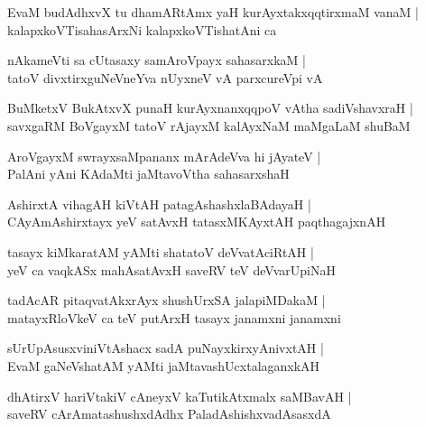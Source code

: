 \documentclass[twoside,12pt,openright]{book}
\newcounter{shloka}[chapter]
\begin{document}
\begin{shloka}%
EvaM budAdhxvX tu dhamARtAmx yaH kurAyxtakxqqtirxmaM vanaM |\\
kalapxkoVTisahasArxNi kalapxkoVTishatAni ca 
\end{shloka}

\begin{shloka}%
nAkameVti sa cUtasaxy samAroVpayx sahasarxkaM |\\
tatoV divxtirxguNeVneYva nUyxneV vA parxcureVpi vA
\end{shloka}

\begin{shloka}%
BuMketxV BukAtxvX punaH kurAyxnanxqqpoV vAtha sadiVshavxraH |\\
savxgaRM BoVgayxM tatoV rAjayxM kalAyxNaM maMgaLaM shuBaM 
\end{shloka}

\begin{shloka}%
AroVgayxM swrayxsaMpananx mArAdeVva hi jAyateV |\\
PalAni yAni KAdaMti jaMtavoVtha sahasarxshaH 
\end{shloka}

\begin{shloka}%
AshirxtA vihagAH kiVtAH patagAshashxlaBAdayaH |\\
CAyAmAshirxtayx yeV satAvxH tatasxMKAyxtAH paqthagajxnAH 
\end{shloka}

\begin{shloka}%
tasayx kiMkaratAM yAMti shatatoV deVvatAciRtAH |\\
yeV ca vaqkASx mahAsatAvxH saveRV teV deVvarUpiNaH 
\end{shloka}

\begin{shloka}%
tadAcAR pitaqvatAkxrAyx shushUrxSA jalapiMDakaM |\\
matayxRloVkeV ca teV putArxH tasayx janamxni janamxni
\end{shloka}

\begin{shloka}%
sUrUpAsusxviniVtAshacx sadA puNayxkirxyAnivxtAH |\\
EvaM gaNeVshatAM yAMti jaMtavashUcxtalaganxkAH 
\end{shloka}

\begin{shloka}%
dhAtirxV hariVtakiV cAneyxV kaTutikAtxmalx saMBavAH |\\
saveRV cArAmatashushxdAdhx PaladAshishxvadAsasxdA 
\end{shloka}
\end{document}
